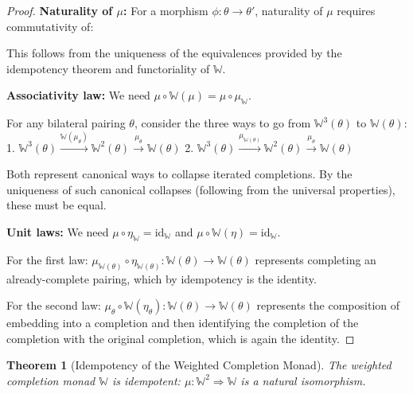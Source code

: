 \documentclass[11pt]{article}
\theoremstyle{plain}
\newtheorem{theorem}{Theorem}[section]
\theoremstyle{definition}
\theoremstyle{remark}
\newcommand{\id}{\mathrm{id}}
\begin{document}
\begin{proof}
\textbf{Naturality of $\mu$:}
For a morphism $\phi : \theta \to \theta'$, naturality of $\mu$ requires commutativity of:
\begin{center}
\end{center}

This follows from the uniqueness of the equivalences provided by the idempotency theorem and functoriality of $\mathbb{W}$.

\textbf{Associativity law:} We need $\mu \circ \mathbb{W}(\mu) = \mu \circ \mu_{\mathbb{W}}$. 

For any bilateral pairing $\theta$, consider the three ways to go from $\mathbb{W}^3(\theta)$ to $\mathbb{W}(\theta)$:
1. $\mathbb{W}^3(\theta) \xrightarrow{\mathbb{W}(\mu_\theta)} \mathbb{W}^2(\theta) \xrightarrow{\mu_\theta} \mathbb{W}(\theta)$
2. $\mathbb{W}^3(\theta) \xrightarrow{\mu_{\mathbb{W}(\theta)}} \mathbb{W}^2(\theta) \xrightarrow{\mu_\theta} \mathbb{W}(\theta)$

Both represent canonical ways to collapse iterated completions. By the uniqueness of such canonical collapses (following from the universal properties), these must be equal.

\textbf{Unit laws:} We need $\mu \circ \eta_{\mathbb{W}} = \id_{\mathbb{W}}$ and $\mu \circ \mathbb{W}(\eta) = \id_{\mathbb{W}}$.

For the first law: $\mu_{\mathbb{W}(\theta)} \circ \eta_{\mathbb{W}(\theta)} : \mathbb{W}(\theta) \to \mathbb{W}(\theta)$ represents completing an already-complete pairing, which by idempotency is the identity.

For the second law: $\mu_\theta \circ \mathbb{W}(\eta_\theta) : \mathbb{W}(\theta) \to \mathbb{W}(\theta)$ represents the composition of embedding into a completion and then identifying the completion of the completion with the original completion, which is again the identity.
\end{proof}

\begin{theorem}[Idempotency of the Weighted Completion Monad]\label{thm:monad-idempotent}
The weighted completion monad $\mathbb{W}$ is idempotent: $\mu : \mathbb{W}^2 \Rightarrow \mathbb{W}$ is a natural isomorphism.
\end{theorem}
\end{document}
